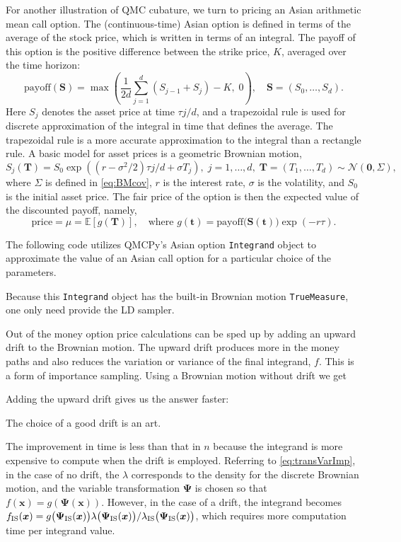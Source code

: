 \documentclass[graybox]{svmult}
\begin{document}
For another illustration of QMC cubature, we turn to pricing an Asian arithmetic mean call option. The (continuous-time) Asian option is defined in terms of the average of the stock price, which is written in terms of an integral. The payoff of this option is the positive difference between the strike price, $K$, averaged over the time horizon: 
$$
\text{payoff}(\boldsymbol{S}) = \max\left(\frac{1}{2d}\sum_{j=1}^d (S_{j-1}+S_j)-K, \; 0\right), \quad \boldsymbol{S} = (S_0, \ldots, S_d).
$$
Here $S_j$ denotes the asset price at time $\tau j/d$, and a trapezoidal rule is used for discrete approximation of the integral in time that defines the average. 
The trapezoidal rule is a more accurate approximation to the integral than a rectangle rule. %
A basic model for asset prices is a geometric Brownian motion, 
\[
S_j(\boldsymbol{T}) = S_0 \exp((r - \sigma^2/2) \tau j/d + \sigma T_j),   \;  j = 1, \ldots, d, \; \boldsymbol{T} = (T_1, \ldots, T_d)\sim \mathcal{N}(\boldsymbol{0},\Sigma),
\]
where $\Sigma$ is defined in \eqref{eq:BMcov}, $r$ is the interest rate, $\sigma$ is the volatility, and $S_0$ is the initial asset price.  The fair price of the option is then the expected value of the discounted payoff, namely,
\begin{equation*}
	\text{price} = \mu = \mathbb{E}[g(\boldsymbol{T})], \quad \text{where } g(\boldsymbol{t}) = \text{payoff}\bigl(\boldsymbol{S}(\boldsymbol{t}) \bigr) \exp(-r \tau).
\end{equation*}

The following code utilizes QMCPy's Asian option \texttt{Integrand} object to approximate the value of an Asian call option for a particular choice of the parameters.

Because this \texttt{Integrand} object has the built-in Brownian motion \texttt{TrueMeasure}, one only need provide the LD sampler.

Out of the money option price calculations can be sped up by adding an upward drift to the Brownian motion.  The upward drift produces more in the money paths and also reduces the variation or variance of the final integrand, $f$.  This is a form of importance sampling.  Using a Brownian motion without drift we get

Adding the upward drift gives us the answer faster:

The choice of a good drift is an art.  

The improvement in time is less than that in $n$ because the integrand is more expensive to compute when the drift is employed.  Referring to \eqref{eq:transVarImp}, in the case of no drift, the $\lambda$ corresponds to the density for the discrete Brownian motion, and the variable transformation $\boldsymbol{\Psi}$ is chosen so that $f(\boldsymbol{x}) = g\left(\boldsymbol{\Psi}(\boldsymbol{x}) \right)$.  However, in the case of a drift, the integrand becomes  $f_\textup{IS}(\boldsymbol{x})  = g\bigl(\boldsymbol{\Psi}_\textup{IS}(\boldsymbol{x})\bigr)  \lambda\bigl(\boldsymbol{\Psi}_\textup{IS}(\boldsymbol{x})\bigr)/\lambda_\textup{IS}\bigl(\boldsymbol{\Psi}_\textup{IS}(\boldsymbol{x})\bigr)$, which requires more computation time per integrand value. 
\end{document}
